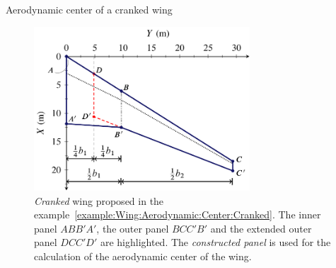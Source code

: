 \documentclass[[12pt,twoside]{book}
\begin{document}
\begin{myExampleX}{Aerodynamic center of a cranked wing}{\ \myIconGraph\ }
\medskip
\noindent
{}

\begin{figure}[t]%
  \centering
    \includegraphics[width=0.72\textwidth]{Chapter_2/aerodynamic_center_of_a_cranked_wing/wing_ac_cranked_1_drawing_panels.pdf}%
  \caption{
          \emph{Cranked} wing proposed in the example~\ref{example:Wing:Aerodynamic:Center:Cranked}.
          The inner panel $ABB'A'$, the outer panel $BCC'B'$ and the extended outer panel $DCC'D'$ are highlighted. The \emph{constructed panel} is used for the calculation of the aerodynamic center of the wing.
  }
  \label{fig:Wing:Aerodynamic:Center:Cranked:Panels}%
\end{figure}%


\end{myExampleX}
\end{document}
